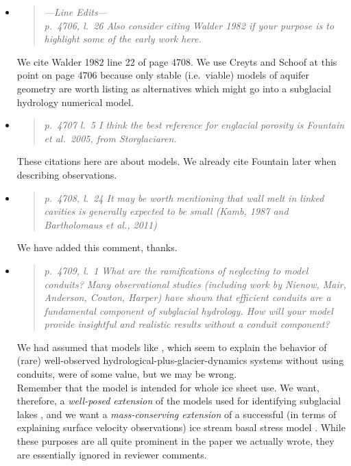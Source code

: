 \documentclass[11pt,reqno]{amsart}
\newcommand{\reply}[2]{
\medskip\medskip
\item  \begin{quote}
\emph{#1}
\end{quote}

\medskip
\noindent #2}
\begin{document}
\begin{itemize}
\reply{---Line Edits---\\
p.~4706, l.~26 Also consider citing Walder 1982 if your purpose is to highlight some of
the early work here.}
{We cite Walder 1982 line 22 of page 4708.  We use Creyts and Schoof at this point on page 4706 because only stable (i.e.~viable) models of aquifer geometry are worth listing as alternatives which might go into a subglacial hydrology numerical model.}

\reply{p.~4707 l.~5 I think the best reference for englacial porosity is Fountain et al.~2005, from Storglaciaren.}
{These citations here are about models.  We already cite Fountain later when describing observations.}

\reply{p.~4708, l.~24 It may be worth mentioning that wall melt in linked cavities is generally
expected to be small (Kamb, 1987 and Bartholomaus et al., 2011)}
{We have added this comment, thanks.}

\reply{p.~4709, l.~1 What are the ramifications of neglecting to model conduits? Many observational studies (including work by Nienow, Mair, Anderson, Cowton, Harper) have
shown that efficient conduits are a fundamental component of subglacial hydrology.
How will your model provide insightful and realistic results without a conduit component?}
{We had assumed that models like \cite{Bartholomausetal2011}, which seem to explain the behavior of (rare) well-observed hydrological-plus-glacier-dynamics systems without using conduits, were of some value, but we may be wrong.\\
\indent Remember that the model is intended for whole ice sheet use.  We want, therefore, a \emph{well-posed extension} of the models used for identifying subglacial lakes \cite{LeBrocqetal2009,Siegertetal2009}, and we want a \emph{mass-conserving extension} of a successful (in terms of explaining surface velocity observations) ice stream basal stress model \cite{AschwandenAdalgeirsdottirKhroulev,BBssasliding,Tulaczyketal2000}.  While these purposes are all quite prominent in the paper we actually wrote, they are essentially ignored in reviewer comments.}


\end{itemize}
\end{document}
